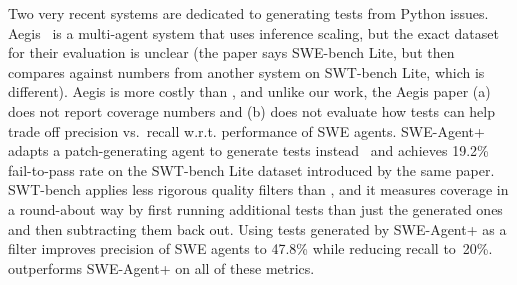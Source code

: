 Two very recent systems are dedicated to generating tests from Python
issues.
Aegis~\cite{aegis} is a multi-agent system that uses inference
scaling, but the exact dataset for their evaluation
is unclear (the paper says SWE-bench Lite, but then compares against
numbers from another system on SWT-bench Lite, which is different).
Aegis is more costly than \soly, and unlike our
work, the Aegis paper (a) does not report coverage numbers and (b) does not evaluate how tests can help trade off precision vs.\ recall w.r.t. performance of SWE agents.
SWE-Agent+ adapts a patch-generating agent to generate tests
instead~\cite{mundler2024swtbench} and achieves 19.2\% fail-to-pass rate on the SWT-bench Lite dataset
introduced by the same paper.
SWT-bench applies less rigorous quality filters than \tdd, and it
measures coverage in a round-about way by first running additional
tests than just the generated ones and then subtracting them back out.
Using tests generated by SWE-Agent+ as a filter improves precision
of SWE agents to 47.8\% while reducing recall to~20\%.
\soly outperforms SWE-Agent+ on all of these metrics.
